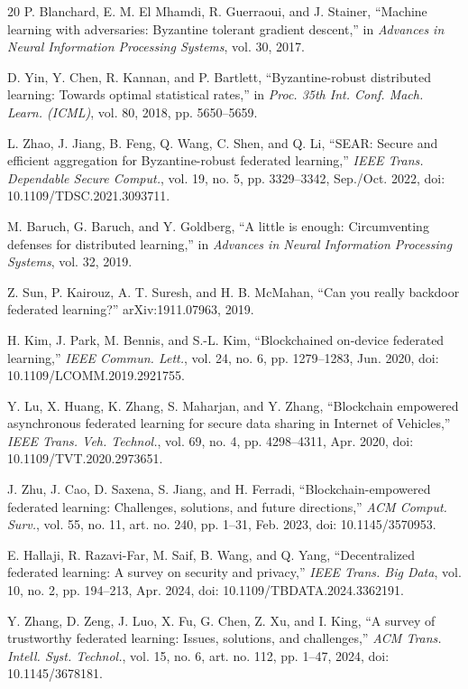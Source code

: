 \documentclass[10pt,letterpaper]{article}
\begin{document}
\begin{thebibliography}{20}
P. Blanchard, E. M. El Mhamdi, R. Guerraoui, and J. Stainer,
``Machine learning with adversaries: Byzantine tolerant gradient descent,''
in \emph{Advances in Neural Information Processing Systems}, vol. 30, 2017.

D. Yin, Y. Chen, R. Kannan, and P. Bartlett,
``Byzantine-robust distributed learning: Towards optimal statistical rates,''
in \emph{Proc. 35th Int. Conf. Mach. Learn. (ICML)}, vol. 80, 2018,
pp. 5650--5659.

L. Zhao, J. Jiang, B. Feng, Q. Wang, C. Shen, and Q. Li,
``SEAR: Secure and efficient aggregation for Byzantine-robust federated
learning,'' \emph{IEEE Trans. Dependable Secure Comput.}, vol. 19, no. 5,
pp. 3329--3342, Sep./Oct. 2022, doi: 10.1109/TDSC.2021.3093711.

M. Baruch, G. Baruch, and Y. Goldberg,
``A little is enough: Circumventing defenses for distributed learning,''
in \emph{Advances in Neural Information Processing Systems}, vol. 32, 2019.

Z. Sun, P. Kairouz, A. T. Suresh, and H. B. McMahan,
``Can you really backdoor federated learning?''
arXiv:1911.07963, 2019.

H. Kim, J. Park, M. Bennis, and S.-L. Kim,
``Blockchained on-device federated learning,''
\emph{IEEE Commun. Lett.}, vol. 24, no. 6, pp. 1279--1283, Jun. 2020,
doi: 10.1109/LCOMM.2019.2921755.

Y. Lu, X. Huang, K. Zhang, S. Maharjan, and Y. Zhang,
``Blockchain empowered asynchronous federated learning for secure data sharing
in Internet of Vehicles,''
\emph{IEEE Trans. Veh. Technol.}, vol. 69, no. 4, pp. 4298--4311, Apr. 2020,
doi: 10.1109/TVT.2020.2973651.

J. Zhu, J. Cao, D. Saxena, S. Jiang, and H. Ferradi,
``Blockchain-empowered federated learning: Challenges, solutions, and future
directions,'' \emph{ACM Comput. Surv.}, vol. 55, no. 11, art. no. 240,
pp. 1--31, Feb. 2023, doi: 10.1145/3570953.

E. Hallaji, R. Razavi-Far, M. Saif, B. Wang, and Q. Yang,
``Decentralized federated learning: A survey on security and privacy,''
\emph{IEEE Trans. Big Data}, vol. 10, no. 2, pp. 194--213, Apr. 2024,
doi: 10.1109/TBDATA.2024.3362191.

Y. Zhang, D. Zeng, J. Luo, X. Fu, G. Chen, Z. Xu, and I. King,
``A survey of trustworthy federated learning: Issues, solutions, and
challenges,'' \emph{ACM Trans. Intell. Syst. Technol.}, vol. 15, no. 6,
art. no. 112, pp. 1--47, 2024, doi: 10.1145/3678181.


\end{thebibliography}
\end{document}
